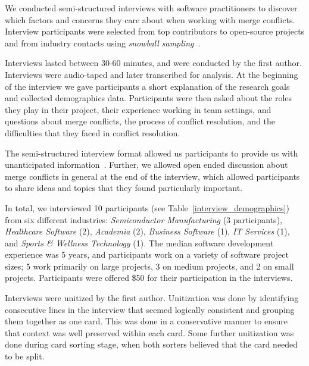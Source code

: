 We conducted semi-structured interviews with software practitioners to discover which factors and concerns they care about when working with merge conflicts.
Interview participants were selected from top contributors to open-source projects and from industry contacts using \textit{snowball sampling}~\cite{goodman1961snowball}.

Interviews lasted between 30-60 minutes, and were conducted by the first author. 
Interviews were audio-taped and later transcribed for analysis. 
At the beginning of the interview we gave participants a short explanation of the research goals and collected demographics data. 
Participants were then asked about the roles they play in their project, their experience working in team settings, and questions about merge conflicts, the process of conflict resolution, and the difficulties that they faced in conflict resolution. 

The semi-structured interview format allowed us participants to provide us with unanticipated information~\cite{seaman2008qualitative}. Further, we allowed open ended discussion about merge conflicts in general at the end of the interview, which allowed participants to share ideas and topics that they found particularly important. 

In total, we interviewed 10 participants (see Table~\ref{interview_demographics}) from six different industries: \textit{Semiconductor Manufacturing} (3 participants), \textit{Healthcare Software} (2), \textit{Academia} (2), \textit{Business Software} (1), \textit{IT Services} (1), and \textit{Sports \& Wellness Technology} (1). The median software development experience was 5 years, and participants work on a variety of software project sizes; 5 work primarily on large projects, 3 on medium projects, and 2 on small projects. Participants were offered \$50 for their participation in the interviews.\\


Interviews were unitized \cite{unitization} by the first author. Unitization was done by identifying consecutive lines in the interview that seemed logically consistent and grouping them together as one card. This was done in a conservative manner to ensure that context was well preserved within each card. Some further unitization was done during card sorting stage, when both sorters believed that the card needed to be split.


